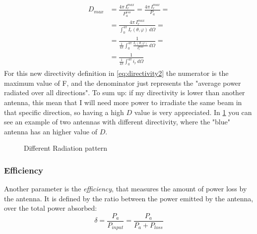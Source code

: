 \begin{align}\label{eq:directivity2}
    \begin{split}
        D_{max}&=\frac{4\pi\,I_r^{max}}{P_a^{iso}}=\frac{4\pi\,I_r^{max}}{P_a}=\\[5pt]
        &=\frac{4\pi\,I_r^{max}}{\int_0^{4\pi}I_r(\theta,\varphi)\,d\Omega}=\\[5pt]
        &=\frac{1}{\frac{1}{4\pi}\int_0^{4\pi}\frac{I_r(\theta,\varphi)}{I_r^{max}}\,d\Omega}=\\[5pt]
        &=\frac{1}{\frac{1}{4\pi}\int_0^{4\pi}i_r\,d\Omega}
    \end{split}
\end{align}
For this new directivity definition in \cref{eq:directivity2} the numerator is the maximum value of F, and the denominator just represents the "average power radiated over all directions".
To sum up: if my directivity is lower than another antenna, this mean that I will need more power to irradiate the same beam in that specific direction, so having a high $D$ value is very appreciated. In \cref{fig:different_radiation_pattern} you can see an example of two antennas with different directivity, where the "blue" antenna has an higher value of $D$.
\begin{figure}[H]
\begin{center}
\end{center} \caption{Different Radiation pattern}\label{fig:different_radiation_pattern} 
\end{figure}
\subsubsection*{Efficiency}
Another parameter is the \emph{efficiency}, that measures the amount of power loss by the antenna. It is defined by the ratio between the power emitted by the antenna, over the total power absorbed:
\begin{equation}\label{eq:atenna_efficency}
    \delta=\frac{P_a}{P_{input}}=\frac{P_a}{P_a+P_{loss}}
\end{equation}
